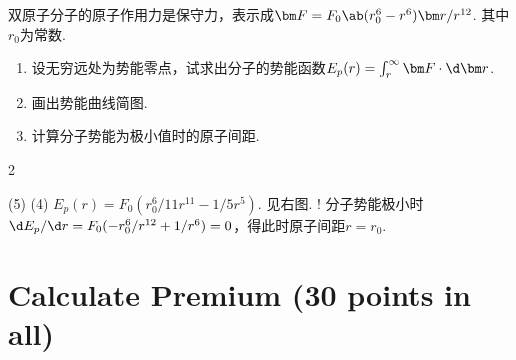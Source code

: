 \begin{problem}
    双原子分子的原子作用力是保守力，表示成$\bm F=F_0\ab(r_0^6-r^6)\bm r/r^{12}$. 其中$r_0$为常数.
    \begin{enumerate}
        \item 设无穷远处为势能零点，试求出分子的势能函数$E_p(r)=\int_r^{\infty}{\bm F\cdot\d\bm r}$.
        \item 画出势能曲线简图.
        \item 计算分子势能为极小值时的原子间距.
    \end{enumerate}
\end{problem}
\begin{paracol}{2}
\begin{solution}\leavevmode
    \begin{tasks}[label=\arabic*.](5)
        \task*(4) $E_p(r)=F_0(r_0^6/11r^{11}-1/5r^5)$.
        \task 见右图.
        \task! 分子势能极小时$\d E_p/\d r=F_0(-r_0^6/r^{12}+1/r^6)=0$，得此时原子间距$r=r_0$.
    \end{tasks}
    \switchcolumn\vspace*{\fill}\centering
    \vspace*{\fill}
\end{solution}
\end{paracol}

\section{Calculate Premium (30 points in all)}

